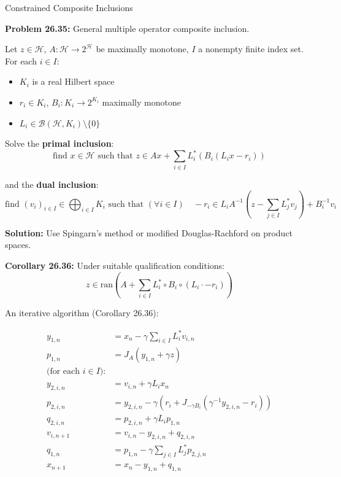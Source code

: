 \documentclass[aspectratio=169,10pt]{beamer}
\begin{document}
\begin{frame}[allowframebreaks]{Constrained Composite Inclusions}

\textbf{Problem 26.35:} General multiple operator composite inclusion.

Let $z \in \mathcal{H}$, $A: \mathcal{H} \to 2^{\mathcal{H}}$ be maximally monotone, $I$ a nonempty finite index set. For each $i \in I$:
\begin{itemize}
  \item $K_i$ is a real Hilbert space
  \item $r_i \in K_i$, $B_i: K_i \to 2^{K_i}$ maximally monotone
  \item $L_i \in \mathcal{B}(\mathcal{H}, K_i) \setminus \{0\}$
\end{itemize}

Solve the \textbf{primal inclusion}:
\[ \text{find } x \in \mathcal{H} \text{ such that } z \in Ax + \sum_{i \in I} L_i^*(B_i(L_i x - r_i)) \]

and the \textbf{dual inclusion}:
\[ \text{find } (v_i)_{i \in I} \in \bigoplus_{i \in I} K_i \text{ such that } (\forall i \in I) \quad -r_i \in L_i A^{-1}\left(z - \sum_{j \in I} L_j^* v_j\right) + B_i^{-1} v_i \]

\vspace{0.3cm}
\textbf{Solution:} Use Spingarn's method or modified Douglas-Rachford on product spaces.

\pagebreak

\textbf{Corollary 26.36:} Under suitable qualification conditions:
\[ z \in \text{ran}\left(A + \sum_{i \in I} L_i^* \circ B_i \circ (L_i \cdot -r_i)\right) \]

An iterative algorithm (Corollary 26.36):

\begin{align*}
  y_{1,n} &= x_n - \gamma \sum_{i \in I} L_i^* v_{i,n} \\
  p_{1,n} &= J_A(y_{1,n} + \gamma z) \\
  \text{(for each } i \in I \text{):} \\
  y_{2,i,n} &= v_{i,n} + \gamma L_i x_n \\
  p_{2,i,n} &= y_{2,i,n} - \gamma(r_i + J_{-\gamma B_i}(\gamma^{-1} y_{2,i,n} - r_i)) \\
  q_{2,i,n} &= p_{2,i,n} + \gamma L_i p_{1,n} \\
  v_{i,n+1} &= v_{i,n} - y_{2,i,n} + q_{2,i,n} \\
  q_{1,n} &= p_{1,n} - \gamma \sum_{j \in I} L_j^* p_{2,j,n} \\
  x_{n+1} &= x_n - y_{1,n} + q_{1,n}
\end{align*}

\end{frame}
\end{document}
